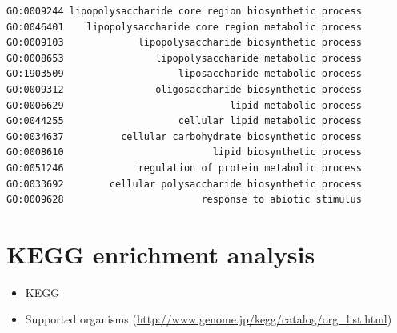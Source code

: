 \documentclass[
]{book}
\newenvironment{Shaded}{\begin{snugshade}}{\end{snugshade}}
\newcommand{\AttributeTok}[1]{\textcolor[rgb]{0.77,0.63,0.00}{#1}}
\newcommand{\CommentTok}[1]{\textcolor[rgb]{0.56,0.35,0.01}{\textit{#1}}}
\newcommand{\ConstantTok}[1]{\textcolor[rgb]{0.00,0.00,0.00}{#1}}
\newcommand{\FloatTok}[1]{\textcolor[rgb]{0.00,0.00,0.81}{#1}}
\newcommand{\FunctionTok}[1]{\textcolor[rgb]{0.00,0.00,0.00}{#1}}
\newcommand{\NormalTok}[1]{#1}
\newcommand{\OtherTok}[1]{\textcolor[rgb]{0.56,0.35,0.01}{#1}}
\newcommand{\SpecialCharTok}[1]{\textcolor[rgb]{0.00,0.00,0.00}{#1}}
\newcommand{\StringTok}[1]{\textcolor[rgb]{0.31,0.60,0.02}{#1}}
\providecommand{\tightlist}{%
  \setlength{\itemsep}{0pt}\setlength{\parskip}{0pt}}
\begin{document}
\begin{Shaded}
\end{Shaded}

\begin{verbatim}
GO:0009244 lipopolysaccharide core region biosynthetic process
GO:0046401    lipopolysaccharide core region metabolic process
GO:0009103             lipopolysaccharide biosynthetic process
GO:0008653                lipopolysaccharide metabolic process
GO:1903509                    liposaccharide metabolic process
GO:0009312                oligosaccharide biosynthetic process
GO:0006629                             lipid metabolic process
GO:0044255                    cellular lipid metabolic process
GO:0034637          cellular carbohydrate biosynthetic process
GO:0008610                          lipid biosynthetic process
GO:0051246             regulation of protein metabolic process
GO:0033692        cellular polysaccharide biosynthetic process
GO:0009628                        response to abiotic stimulus
\end{verbatim}

\hypertarget{kegg-enrichment-analysis}{%
\section{KEGG enrichment analysis}\label{kegg-enrichment-analysis}}

\begin{itemize}
\tightlist
\item
  KEGG
\item
  Supported organisms (\url{http://www.genome.jp/kegg/catalog/org_list.html})
\end{itemize}
\end{document}
